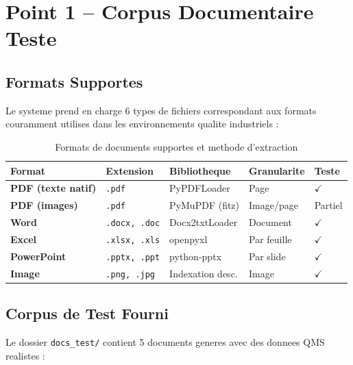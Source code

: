 \documentclass[12pt,a4paper]{article}
\begin{document}
\section{Point 1 -- Corpus Documentaire Teste}

\subsection{Formats Supportes}

Le systeme prend en charge 6 types de fichiers correspondant aux formats couramment
utilises dans les environnements qualite industriels :

\begin{table}[h]
\centering
\caption{Formats de documents supportes et methode d'extraction}
\begin{tabular}{>{\bfseries}lllll}
\toprule
Format & Extension & Bibliotheque & Granularite & Teste \\
\midrule
PDF (texte natif) & \texttt{.pdf} & PyPDFLoader & Page & \color{success}$\checkmark$ \\
PDF (images) & \texttt{.pdf} & PyMuPDF (fitz) & Image/page & \color{warning}Partiel \\
Word & \texttt{.docx, .doc} & Docx2txtLoader & Document & \color{success}$\checkmark$ \\
Excel & \texttt{.xlsx, .xls} & openpyxl & Par feuille & \color{success}$\checkmark$ \\
PowerPoint & \texttt{.pptx, .ppt} & python-pptx & Par slide & \color{success}$\checkmark$ \\
Image & \texttt{.png, .jpg} & Indexation desc. & Image & \color{success}$\checkmark$ \\
\bottomrule
\end{tabular}
\end{table}

\subsection{Corpus de Test Fourni}

Le dossier \texttt{docs\_test/} contient 5 documents generes avec des donnees QMS realistes :
\end{document}
